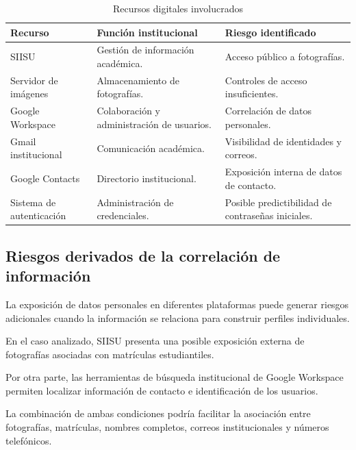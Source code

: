 \documentclass[12pt]{article}
\begin{document}
\begin{table}[H]
\centering
\caption{Recursos digitales involucrados}
\label{tab:recursos_digitales}
\small
\begin{tabularx}{\textwidth}{|X|X|X|}
\hline
\textbf{Recurso} &
\textbf{Función institucional} &
\textbf{Riesgo identificado} \\ \hline

SIISU &
Gestión de información académica. &
Acceso público a fotografías. \\ \hline

Servidor de imágenes &
Almacenamiento de fotografías. &
Controles de acceso insuficientes. \\ \hline

Google Workspace &
Colaboración y administración de usuarios. &
Correlación de datos personales. \\ \hline

Gmail institucional &
Comunicación académica. &
Visibilidad de identidades y correos. \\ \hline

Google Contacts &
Directorio institucional. &
Exposición interna de datos de contacto. \\ \hline

Sistema de autenticación &
Administración de credenciales. &
Posible predictibilidad de
contraseñas iniciales. \\ \hline

\end{tabularx}
\end{table}


\subsection{Riesgos derivados de la
correlación de información}

La exposición de datos personales en
diferentes plataformas puede generar
riesgos adicionales cuando la información
se relaciona para construir perfiles
individuales.

En el caso analizado, SIISU presenta
una posible exposición externa de
fotografías asociadas con matrículas
estudiantiles.

Por otra parte, las herramientas de
búsqueda institucional de Google Workspace
permiten localizar información de
contacto e identificación de los usuarios.

La combinación de ambas condiciones
podría facilitar la asociación entre
fotografías, matrículas, nombres completos,
correos institucionales y números telefónicos.
\end{document}
